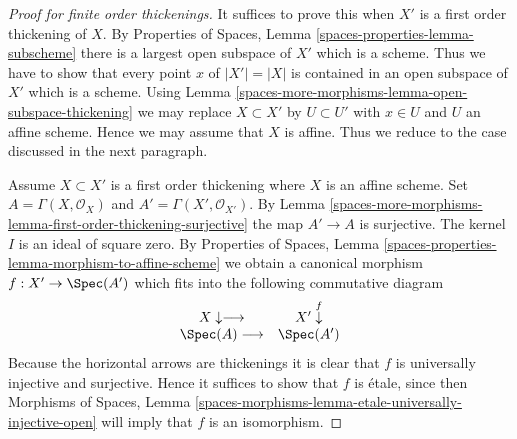 \begin{proof}[Proof for finite order thickenings]
It suffices to prove this when $X'$ is a first order thickening of $X$. By
Properties of Spaces, Lemma \ref{spaces-properties-lemma-subscheme}
there is a largest open subspace of $X'$ which is a scheme. Thus we have
to show that every point $x$ of $|X'| = |X|$ is contained in an open subspace of
$X'$ which is a scheme. Using
Lemma \ref{spaces-more-morphisms-lemma-open-subspace-thickening}
we may replace $X \subset X'$ by $U \subset U'$ with $x \in U$ and $U$
an affine scheme. Hence we may assume that $X$ is affine.
Thus we reduce to the case discussed in the next paragraph.

\medskip\noindent
Assume $X \subset X'$ is a first order thickening where $X$ is an affine
scheme. Set $A = \Gamma(X, \mathcal{O}_X)$ and
$A' = \Gamma(X', \mathcal{O}_{X'})$. By
Lemma \ref{spaces-more-morphisms-lemma-first-order-thickening-surjective}
the map $A' \to A$ is surjective. The kernel $I$ is an ideal of square zero. By
Properties of Spaces,
Lemma \ref{spaces-properties-lemma-morphism-to-affine-scheme}
we obtain a canonical morphism $f : X' \to \Spec(A')$ which fits
into the following commutative diagram
$$
\begin{array}{cc}X \downarrow\longrightarrow & X' \overset{f}{\downarrow} \\ \Spec(A) \longrightarrow & \Spec(A')\end{array}
$$
Because the horizontal arrows are thickenings it is clear that $f$ is
universally injective and surjective. Hence it suffices to show that
$f$ is \'etale, since then
Morphisms of Spaces,
Lemma \ref{spaces-morphisms-lemma-etale-universally-injective-open}
will imply that $f$ is an isomorphism.


\end{proof}
